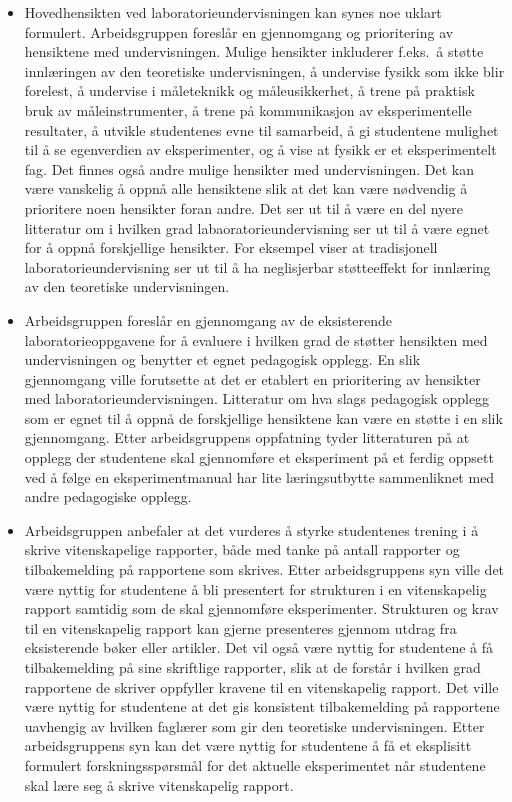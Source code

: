\documentclass{article}
\begin{document}

\begin{itemize}
  \item Hovedhensikten ved laboratorieundervisningen kan synes noe uklart formulert. Arbeidsgruppen foreslår en gjennomgang og prioritering av hensiktene med undervisningen. Mulige hensikter inkluderer f.eks.~å støtte innlæringen av den teoretiske undervisningen, å undervise fysikk som ikke blir forelest, å undervise i måleteknikk og måleusikkerhet, å trene på praktisk bruk av måleinstrumenter, å trene på kommunikasjon av eksperimentelle resultater, å utvikle studentenes evne til samarbeid, å gi studentene mulighet til å se egenverdien av eksperimenter, og å vise at fysikk er et eksperimentelt fag. Det finnes også andre mulige hensikter med undervisningen. Det kan være vanskelig å oppnå alle hensiktene slik at det kan være nødvendig å prioritere noen hensikter foran andre. Det ser ut til å være en del nyere litteratur om i hvilken grad labaoratorieundervisning ser ut til å være egnet for å oppnå forskjellige hensikter. For eksempel viser \citet{Holmes} at tradisjonell laboratorieundervisning ser ut til å ha neglisjerbar støtteeffekt for innlæring av den teoretiske undervisningen.
   
  \item Arbeidsgruppen foreslår en gjennomgang av de eksisterende laboratorieoppgavene for å evaluere i hvilken grad de støtter hensikten med undervisningen og benytter et egnet pedagogisk opplegg. En slik gjennomgang ville forutsette at det er etablert en prioritering av hensikter med laboratorieundervisningen. Litteratur om hva slags pedagogisk opplegg som er egnet til å oppnå de forskjellige hensiktene kan være en støtte i en slik gjennomgang. Etter arbeidsgruppens oppfatning tyder litteraturen på at opplegg der studentene skal gjennomføre et eksperiment på et ferdig oppsett ved å følge en eksperimentmanual har lite læringsutbytte sammenliknet med andre pedagogiske opplegg.

  \item Arbeidsgruppen anbefaler at det vurderes å styrke studentenes trening i å skrive vitenskapelige rapporter, både med tanke på antall rapporter og tilbakemelding på rapportene som skrives. Etter arbeidsgruppens syn ville det være nyttig for studentene å bli presentert for strukturen i en vitenskapelig rapport samtidig som de skal gjennomføre eksperimenter. Strukturen og krav til en vitenskapelig rapport kan gjerne presenteres gjennom utdrag fra eksisterende bøker eller artikler. Det vil også være nyttig for studentene å få tilbakemelding på sine skriftlige rapporter, slik at de forstår i hvilken grad rapportene de skriver oppfyller kravene til en vitenskapelig rapport. Det ville være nyttig for studentene at det gis konsistent tilbakemelding på rapportene uavhengig av hvilken faglærer som gir den teoretiske undervisningen. Etter arbeidsgruppens syn kan det være nyttig for studentene å få et eksplisitt formulert forskningsspørsmål for det aktuelle eksperimentet når studentene skal lære seg å skrive vitenskapelig rapport.


\end{itemize}
\end{document}
